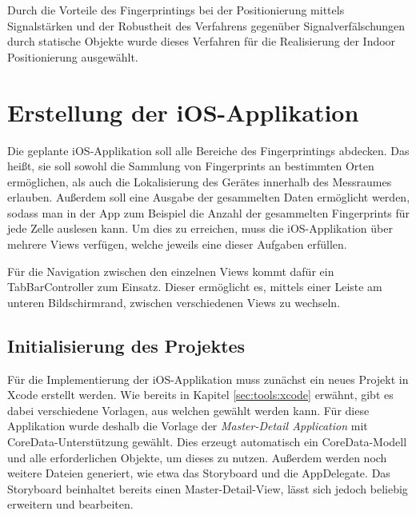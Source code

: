 Durch die Vorteile des Fingerprintings bei der Positionierung mittels Signalstärken und der Robustheit des Verfahrens gegenüber Signalverfälschungen durch statische Objekte wurde dieses Verfahren für die Realisierung der Indoor Positionierung ausgewählt.


\section{Erstellung der iOS-Applikation}
\label{sec:implementation:iosapplication}

Die geplante iOS-Applikation soll alle Bereiche des Fingerprintings abdecken. 
Das heißt, sie soll sowohl die Sammlung von Fingerprints an bestimmten Orten ermöglichen, als auch die Lokalisierung des Gerätes innerhalb des Messraumes erlauben.
Außerdem soll eine Ausgabe der gesammelten Daten ermöglicht werden, sodass man in der App zum Beispiel die Anzahl der gesammelten Fingerprints für jede Zelle auslesen kann.
Um dies zu erreichen, muss die iOS-Applikation über mehrere Views verfügen, welche jeweils eine dieser Aufgaben erfüllen.

Für die Navigation zwischen den einzelnen Views kommt dafür ein TabBarController zum Einsatz. Dieser ermöglicht es, mittels einer Leiste am unteren Bildschirmrand, zwischen verschiedenen Views zu wechseln.


\subsection{Initialisierung des Projektes}
\label{sec:implementation:iosapplication:initializing}

Für die Implementierung der iOS-Applikation muss zunächst ein neues Projekt in Xcode erstellt werden. Wie bereits in Kapitel \ref{sec:tools:xcode} erwähnt, gibt es dabei verschiedene Vorlagen, aus welchen gewählt werden kann. Für diese Applikation wurde deshalb die Vorlage der \emph{Master-Detail Application} mit CoreData-Unterstützung gewählt. Dies erzeugt automatisch ein CoreData-Modell und alle erforderlichen Objekte, um dieses zu nutzen. Außerdem werden noch weitere Dateien generiert, wie etwa das Storyboard und die AppDelegate.
Das Storyboard beinhaltet bereits einen Master-Detail-View, lässt sich jedoch beliebig erweitern und bearbeiten. 

